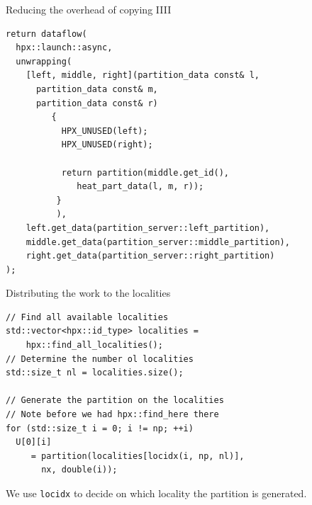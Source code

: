 \documentclass[12pt,t]{beamer}
\begin{document}
\begin{frame}[fragile]{Reducing the overhead of copying IIII}

\begin{lstlisting}
return dataflow(
  hpx::launch::async,
  unwrapping(
    [left, middle, right](partition_data const& l, 
      partition_data const& m,
      partition_data const& r)
         {
           HPX_UNUSED(left);
           HPX_UNUSED(right);

           return partition(middle.get_id(), 
              heat_part_data(l, m, r));
          }
          ),
    left.get_data(partition_server::left_partition),
    middle.get_data(partition_server::middle_partition),
    right.get_data(partition_server::right_partition)
);
\end{lstlisting}

\end{frame}

\begin{frame}[fragile]{Distributing the work to the localities}

\begin{lstlisting}
// Find all available localities
std::vector<hpx::id_type> localities = 
	hpx::find_all_localities();
// Determine the number ol localities
std::size_t nl = localities.size(); 

// Generate the partition on the localities
// Note before we had hpx::find_here there
for (std::size_t i = 0; i != np; ++i)
  U[0][i] 
     = partition(localities[locidx(i, np, nl)], 
       nx, double(i));
\end{lstlisting}

We use \lstinline|locidx| to decide on which locality the partition is generated.
\end{frame}
\end{document}
